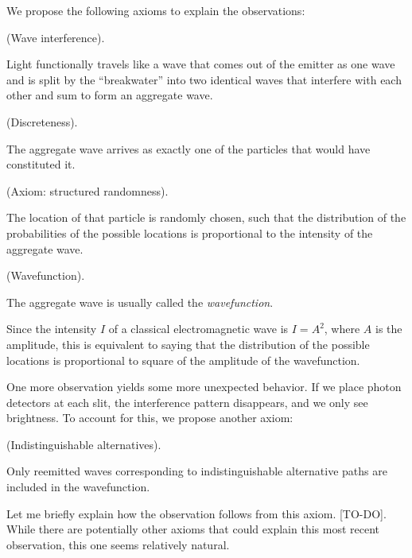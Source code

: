 \documentclass{article}
\begin{document}
We propose the following axioms to explain the observations:

\begin{axiom}
	(Wave interference).
	
	Light functionally travels like a wave that comes out of the emitter as one wave and is split by the “breakwater” into two identical waves that interfere with each other and sum to form an aggregate wave.
\end{axiom}

\begin{axiom}
	(Discreteness).
	
	The aggregate wave arrives as exactly one of the particles that would have constituted it.
\end{axiom}

\begin{axiom}
	(Axiom: structured randomness).
	
	The location of that particle is randomly chosen, such that the distribution of the probabilities of the possible locations is proportional to the intensity of the aggregate wave.
	
\end{axiom}

\begin{defn}
	(Wavefunction).
	
	The aggregate wave is usually called the \textit{wavefunction}.
\end{defn}

Since the intensity $I$ of a classical electromagnetic wave is $I = A^2$, where $A$ is the amplitude, this is equivalent to saying that the distribution of the possible locations is proportional to square of the amplitude of the wavefunction.

One more observation yields some more unexpected behavior. If we place photon detectors at each slit, the interference pattern disappears, and we only see brightness. To account for this, we propose another axiom:

\begin{axiom}
	(Indistinguishable alternatives).
	
	Only reemitted waves corresponding to indistinguishable alternative paths are included in the wavefunction.
\end{axiom}

Let me briefly explain how the observation follows from this axiom. [TO-DO]. While there are potentially other axioms that could explain this most recent observation, this one seems relatively natural.
\end{document}
